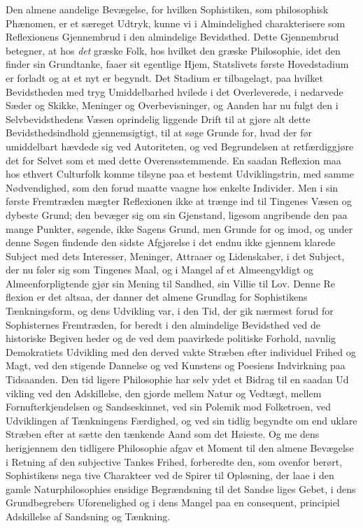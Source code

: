 \documentclass[12pt,a4paper]{book}
\begin{document}
Den almene aandelige Bevægelse, for hvilken Sophistiken,
som philosophisk Phænomen, er et særeget Udtryk, kunne vi
i Almindelighed charakterisere som Reflexionens Gjennembrud
i den almindelige Bevidsthed. Dette Gjennembrud betegner,
at hos \emph{det} græske Folk, hos hvilket den græske Philosophie,
idet den finder sin Grundtanke, faaer sit egentlige Hjem,
Statslivets første Hovedstadium er forladt og at et nyt er
begyndt. Det Stadium er tilbagelagt, paa hvilket Bevidstheden
med tryg Umiddelbarhed hvilede i det Overleverede, i nedarvede
Sæder og Skikke, Meninger og Overbevisninger, og Aanden
har nu fulgt den i Selvbevidsthedens Væsen oprindelig liggende
Drift til at gjøre alt dette Bevidsthedsindhold gjennemsigtigt,
til at søge Grunde for, hvad der før umiddelbart hævdede sig
ved Autoriteten, og ved Begrundelsen at retfærdiggjøre det for
Selvet som et med dette Overensstemmende. En saadan
Reflexion maa hos ethvert Culturfolk komme tilsyne paa et
bestemt Udviklingstrin, med samme Nødvendighed, som den
forud maatte vaagne hos enkelte Individer. Men i sin første
Fremtræden mægter Reflexionen ikke at trænge ind til Tingenes
Væsen og dybeste Grund; den bevæger sig om sin Gjenstand,
ligesom angribende den paa mange Punkter, søgende, ikke
Sagens Grund, men Grunde for og imod, og under denne
Søgen findende den sidste Afgjørelse i det endnu ikke gjennem\-%
klarede Subject med dets Interesser, Meninger, Attraaer og
Lidenskaber, i det Subject, der nu føler sig som Tingenes
Maal, og i Mangel af et Almeengyldigt og Almeenforpligtende
gjør sin Mening til Sandhed, sin Villie til Lov. Denne Re\-%
flexion er det altsaa, der danner det almene Grundlag for
Sophistikens Tænkningsform, og dens Udvikling var, i den
Tid, der gik nærmest forud for Sophisternes Fremtræden, for\-%
beredt i den almindelige Bevidsthed ved de historiske Begiven\-%
heder og de ved dem paavirkede politiske Forhold, navnlig
Demokratiets Udvikling med den derved vakte Stræben efter
individuel Frihed og Magt, ved den stigende Dannelse og ved
Kunstens og Poesiens Indvirkning paa Tidsaanden. Den tid\-%
ligere Philosophie har selv ydet et Bidrag til en saadan Ud\-%
vikling ved den Adskillelse, den gjorde mellem Natur og
Vedtægt, mellem Fornufterkjendelsen og Sandseskinnet, ved sin
Polemik mod Folketroen, ved Udviklingen af Tænkningens
Færdighed, og ved sin tidlig begyndte om end uklare Stræben
efter at sætte den tænkende Aand som det Høieste. Og me\-%
dens herigjennem den tidligere Philosophie afgav et Moment
til den almene Bevægelse i Retning af den subjective Tankes
Frihed, forberedte den, som ovenfor berørt, Sophistikens nega\-%
tive Charakteer ved de Spirer til Opløsning, der laae i den
gamle Naturphilosophies ensidige Begrændsning til det Sandse\-%
liges Gebet, i dens Grundbegrebers Uforenelighed og i dens
Mangel paa en consequent, principiel Adskillelse af Sandsning
og Tænkning.
\end{document}
